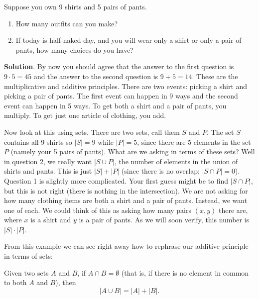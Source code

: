 \documentclass[11pt,]{book}
\theoremstyle{ptxplainnotitle}
\theoremstyle{ptxplaintitle}
\theoremstyle{ptxdefinitionnotitle}
\theoremstyle{ptxdefinitiontitle}
\theoremstyle{ptxdefinitionnotitle}
\theoremstyle{ptxdefinitiontitle}
\theoremstyle{ptxdefinitionnotitle}
\theoremstyle{ptxdefinitiontitle}
\theoremstyle{ptxdefinitiontitlenonumber}
\theoremstyle{ptxdefinitiontitlenonumber}
\numberwithin{equation}{chapter}
\newcommand{\card}[1]{\left| #1 \right|}
\begin{document}
\begin{example}\label{example-39}
\hypertarget{p-991}{}%
Suppose you own 9 shirts and 5 pairs of pants.%
\par
\hypertarget{p-992}{}%
\leavevmode%
\begin{enumerate}
\item\hypertarget{li-446}{}\hypertarget{p-993}{}%
How many outfits can you make?%
\item\hypertarget{li-447}{}\hypertarget{p-994}{}%
If today is half-naked-day, and you will wear only a shirt or only a pair of pants, how many choices do you have?%
\end{enumerate}
%
\par\smallskip%
\noindent\textbf{Solution}.\hypertarget{solution-129}{}\quad%
\hypertarget{p-995}{}%
By now you should agree that the answer to the first question is \(9 \cdot 5 = 45\) and the answer to the second question is \(9 + 5 = 14\). These are the multiplicative and additive principles. There are two events: picking a shirt and picking a pair of pants. The first event can happen in 9 ways and the second event can happen in 5 ways. To get both a shirt and a pair of pants, you multiply. To get just one article of clothing, you add.%
\par
\hypertarget{p-996}{}%
Now look at this using sets. There are two sets, call them \(S\) and \(P\). The set \(S\) contains all 9 shirts so \(|S| = 9\) while \(|P| = 5\), since there are 5 elements in the set \(P\) (namely your 5 pairs of pants). What are we asking in terms of these sets? Well in question 2, we really want \(|S \cup P|\), the number of elements in the union of shirts and pants. This is just \(|S| + |P|\) (since there is no overlap; \(|S \cap P| = 0\)). Question 1 is slightly more complicated. Your first guess might be to find \(|S \cap P|\), but this is not right (there is nothing in the intersection). We are not asking for how many clothing items are both a shirt and a pair of pants. Instead, we want one of each. We could think of this as asking how many pairs \((x,y)\) there are, where \(x\) is a shirt and \(y\) is a pair of pants. As we will soon verify, this number is \(|S| \cdot |P|\).%
\end{example}
\hypertarget{p-997}{}%
From this example we can see right away how to rephrase our additive principle in terms of sets:%
\begin{assemblage}\label{assemblage-13}
\hypertarget{p-998}{}%
 Given two sets \(A\) and \(B\), if \(A \cap B = \emptyset\) (that is, if there is no element in common to both \(A\) and \(B\)), then%
\begin{equation*}
\card{A \cup B} = \card{A} + \card{B}.
\end{equation*}
%
\end{assemblage}
\end{document}
